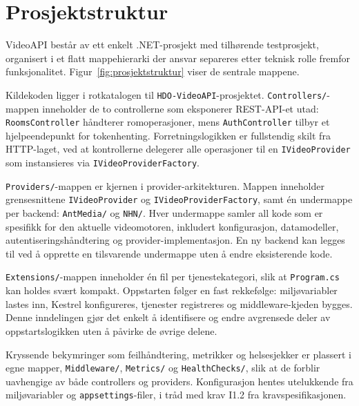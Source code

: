 \section{Prosjektstruktur}
\label{sec:prosjektstruktur}

VideoAPI består av ett enkelt .NET-prosjekt med tilhørende testprosjekt, organisert i et flatt mappehierarki der ansvar separeres etter teknisk rolle fremfor funksjonalitet. Figur~\ref{fig:prosjektstruktur} viser de sentrale mappene.

Kildekoden ligger i rotkatalogen til \texttt{HDO-VideoAPI}-prosjektet. \texttt{Controllers/}-mappen inneholder de to controllerne som eksponerer REST-API-et utad: \texttt{RoomsController} håndterer romoperasjoner, mens \texttt{AuthController} tilbyr et hjelpeendepunkt for tokenhenting.
Forretningslogikken er fullstendig skilt fra HTTP-laget, ved at kontrollerne delegerer alle operasjoner til en \texttt{IVideoProvider} som instansieres via \texttt{IVideoProviderFactory}.

\texttt{Providers/}-mappen er kjernen i provider-arkitekturen. Mappen inneholder grensesnittene \texttt{IVideoProvider} og \texttt{IVideoProviderFactory}, samt én undermappe per backend: \texttt{AntMedia/} og \texttt{NHN/}. Hver undermappe samler all kode som er spesifikk for den aktuelle videomotoren, inkludert konfigurasjon, datamodeller, autentiseringshåndtering og provider-implementasjon. En ny backend kan legges til ved å opprette en tilsvarende undermappe uten å endre eksisterende kode.

\texttt{Extensions/}-mappen inneholder én fil per tjenestekategori, slik at \texttt{Program.cs} kan holdes svært kompakt. Oppstarten følger en fast rekkefølge: miljøvariabler lastes inn, Kestrel konfigureres, tjenester registreres og middleware-kjeden bygges. Denne inndelingen gjør det enkelt å identifisere og endre avgrensede deler av oppstartslogikken uten å påvirke de øvrige delene.

Kryssende bekymringer som feilhåndtering, metrikker og helsesjekker er plassert i egne mapper, \texttt{Middleware/}, \texttt{Metrics/} og \texttt{HealthChecks/}, slik at de forblir uavhengige av både controllers og providers. Konfigurasjon hentes utelukkende fra miljøvariabler og
\texttt{appsettings}-filer, i tråd med krav I1.2 \cite{hdo_kravspec} fra kravspesifikasjonen.


